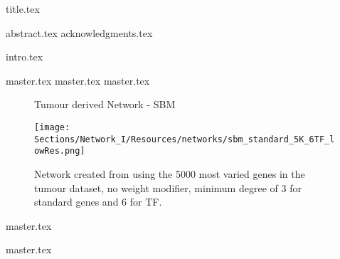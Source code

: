 \documentclass[a4paper, 12pt]{report}
\begin{document}
{title.tex}



\setcounter{tocdepth}{4}





{abstract.tex}
{acknowledgments.tex}


\tableofcontents
\newpage

\listoffigures
\newpage

\listoftables

\clearpage


\printglossary[nonumberlist]

\printglossary[type=\acronymtype,nonumberlist]
\newpage




{intro.tex}

{master.tex}
{master.tex}
{master.tex}


\newpage
{}
\begin{figure}[p]
  \thispagestyle{empty} %
  \centering
  \captionsetup{justification=centering, labelfont=bf}
    \parbox{\textwidth}{\centering \Huge Tumour derived Network - SBM} %
  \vspace{3cm} 
  \texttt{[image: Sections/Network\_I/Resources/networks/sbm\_standard\_5K\_6TF\_lowRes.png]} %
  \parbox{0.8\textwidth}{\centering Network created from using the 5000 most varied genes in the tumour dataset, no weight modifier, minimum degree of 3 for standard genes and 6 for TF.}
\end{figure}
\restoregeometry
\newpage

{master.tex}


{master.tex}
\end{document}
